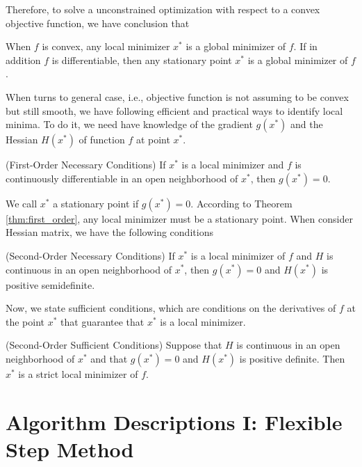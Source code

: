 \documentclass[11pt]{report}
\begin{document}
Therefore, to solve a unconstrained optimization with respect to a convex objective function, we have conclusion that
\begin{theorem}
When $f$ is convex, any local minimizer $x^*$ is a global minimizer of $f$. If in addition $f$ is differentiable, then any stationary point $x^*$ is a global minimizer of $f$.
\end{theorem}

When turns to general case, i.e., objective function is not assuming to be convex but still smooth, we have following efficient and practical ways to identify local minima. To do it, we need have knowledge of the gradient $g(x^*)$ and the Hessian $H(x^*)$ of function $f$ at point $x^*$.
\begin{theorem}(First-Order Necessary Conditions)\label{thm:first_order}
    If $x^*$ is a local minimizer and $f$ is continuously differentiable in an open neighborhood of $x^*$, then $g(x^*)=0$.
\end{theorem}

We call $x^*$ a stationary point if $g(x^*)=0$. According to Theorem \ref{thm:first_order}, any local minimizer must be a stationary point. When consider Hessian matrix, we have the following conditions
\begin{theorem}(Second-Order Necessary Conditions)
If $x^*$ is a local minimizer of $f$ and $H$ is continuous in an open neighborhood of $x^*$, then $g(x^*) = 0$ and $H(x^*)$ is positive semidefinite.
\end{theorem}

Now, we state sufficient conditions, which are conditions on the derivatives of $f$ at the point $x^*$ that guarantee that $x^*$ is a local minimizer.
\begin{theorem}(Second-Order Sufficient Conditions)
Suppose that $H$ is continuous in an open neighborhood of $x^*$ and that $g(x^*) = 0$ and $H(x^*)$ is positive definite. Then $x^*$ is a strict local minimizer of $f$.
\end{theorem}

\chapter{Algorithm Descriptions I: Flexible Step Method}\label{chp: flexible}

\end{document}

